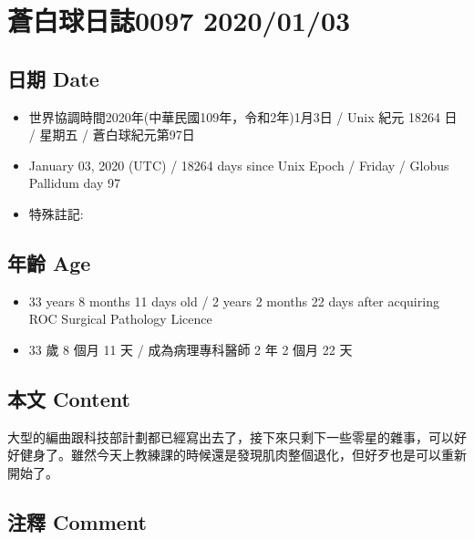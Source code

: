\documentclass[
]{article}
\providecommand{\tightlist}{%
  \setlength{\itemsep}{0pt}\setlength{\parskip}{0pt}}
\begin{document}
\hypertarget{ux84bcux767dux7403ux65e5ux8a8c0097-20200103}{%
\section{蒼白球日誌0097
2020/01/03}\label{ux84bcux767dux7403ux65e5ux8a8c0097-20200103}}

\hypertarget{ux65e5ux671f-date-2}{%
\subsection{日期 Date}\label{ux65e5ux671f-date-2}}

\begin{itemize}
\tightlist
\item
  世界協調時間2020年(中華民國109年，令和2年)1月3日 / Unix 紀元 18264 日
  / 星期五 / 蒼白球紀元第97日
\item
  January 03, 2020 (UTC) / 18264 days since Unix Epoch / Friday / Globus
  Pallidum day 97
\item
  特殊註記:
\end{itemize}

\hypertarget{ux5e74ux9f61-age-2}{%
\subsection{年齡 Age}\label{ux5e74ux9f61-age-2}}

\begin{itemize}
\tightlist
\item
  33 years 8 months 11 days old / 2 years 2 months 22 days after
  acquiring ROC Surgical Pathology Licence
\item
  33 歲 8 個月 11 天 / 成為病理專科醫師 2 年 2 個月 22 天
\end{itemize}

\hypertarget{ux672cux6587-content-2}{%
\subsection{本文 Content}\label{ux672cux6587-content-2}}

大型的編曲跟科技部計劃都已經寫出去了，接下來只剩下一些零星的雜事，可以好好健身了。雖然今天上教練課的時候還是發現肌肉整個退化，但好歹也是可以重新開始了。

\hypertarget{ux6ce8ux91cb-comment-2}{%
\subsection{注釋 Comment}\label{ux6ce8ux91cb-comment-2}}
\end{document}
